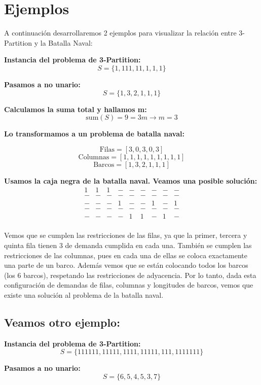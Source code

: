 \section*{Ejemplos}

A continuación desarrollaremos 2 ejemplos para visualizar la relación entre 3-Partition y la Batalla Naval:

\textbf{Instancia del problema de 3-Partition:}
\[
S = \{1, 111, 11, 1, 1, 1\}
\]

\textbf{Pasamos a no unario:}
\[
S = \{1, 3, 2, 1, 1, 1\}
\]

\textbf{Calculamos la suma total y hallamos m:}
\[
\text{sum}(S) = 9 = 3m \rightarrow m = 3
\]

\textbf{Lo transformamos a un problema de batalla naval:}

\[
\text{Filas} = [3, 0, 3, 0, 3]
\]
\[
\text{Columnas} = [1, 1, 1, 1, 1, 1, 1, 1, 1]
\]
\[
\text{Barcos} = [1, 3, 2, 1, 1, 1]
\]

\textbf{Usamos la caja negra de la batalla naval. Veamos una posible solución:}
\[
\begin{array}{ccccccccc}
1 & 1 & 1 & - & - & - & - & - & - \\
- & - & - & - & - & - & - & - & - \\
- & - & - & 1 & - & - & 1 & - & 1 \\
- & - & - & - & - & - & - & - & - \\
- & - & - & - & 1 & 1 & - & 1 & - \\
\end{array}
\]

Vemos que se cumplen las restricciones de las filas, ya que la primer, tercera y quinta fila tienen 3 de demanda cumplida en cada una.
También se cumplen las restricciones de las columnas, pues en cada una de ellas se coloca exactamente una parte de un barco.
Además vemos que se están colocando todos los barcos (los 6 barcos), respetando las restricciones de adyacencia.
Por lo tanto, dada esta configuración de demandas de filas, columnas y longitudes de barcos, vemos que existe una solución al problema de la batalla naval.

\subsection{Veamos otro ejemplo:}

\textbf{Instancia del problema de 3-Partition:}
\[
S = \{111111, 11111, 1111, 11111, 111, 1111111\}
\]

\textbf{Pasamos a no unario:}
\[
S = \{6, 5, 4, 5, 3, 7\}
\]

